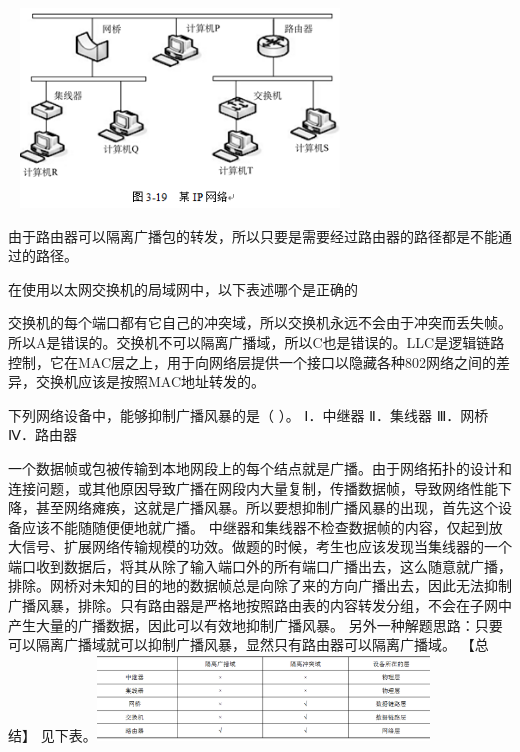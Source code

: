 ~
\includegraphics[width=3.33333in,height=2.08333in]{computerassets/8d1744c03d695e45dcb1f35ee5cc4189.png}
\par{}
\begin{solution}由于路由器可以隔离广播包的转发，所以只要是需要经过路由器的路径都是不能通过的路径。
\end{solution}
\question 在使用以太网交换机的局域网中，以下表述哪个是正确的
\par{}
\begin{solution}交换机的每个端口都有它自己的冲突域，所以交换机永远不会由于冲突而丢失帧。所以A是错误的。交换机不可以隔离广播域，所以C也是错误的。LLC是逻辑链路控制，它在MAC层之上，用于向网络层提供一个接口以隐藏各种802网络之间的差异，交换机应该是按照MAC地址转发的。
\end{solution}
\question 下列网络设备中，能够抑制广播风暴的是（ ）。 Ⅰ．中继器 Ⅱ．集线器 Ⅲ．网桥
Ⅳ．路由器
\par{}
\begin{solution}一个数据帧或包被传输到本地网段上的每个结点就是广播。由于网络拓扑的设计和连接问题，或其他原因导致广播在网段内大量复制，传播数据帧，导致网络性能下降，甚至网络瘫痪，这就是广播风暴。所以要想抑制广播风暴的出现，首先这个设备应该不能随随便便地就广播。
中继器和集线器不检查数据帧的内容，仅起到放大信号、扩展网络传输规模的功效。做题的时候，考生也应该发现当集线器的一个端口收到数据后，将其从除了输入端口外的所有端口广播出去，这么随意就广播，排除。网桥对未知的目的地的数据帧总是向除了来的方向广播出去，因此无法抑制广播风暴，排除。只有路由器是严格地按照路由表的内容转发分组，不会在子网中产生大量的广播数据，因此可以有效地抑制广播风暴。
另外一种解题思路：只要可以隔离广播域就可以抑制广播风暴，显然只有路由器可以隔离广播域。
【总结】
见下表。\includegraphics[width=3.46875in,height=0.89583in]{computerassets/DB7F9A377704A937E9E2FF74A32807E0.png}
\end{solution}
